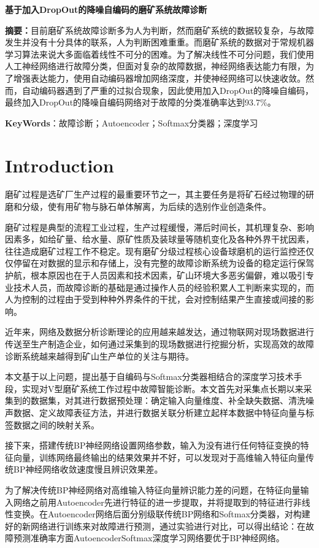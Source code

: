 
\textbf{基于加入DropOut的降噪自编码的磨矿系统故障诊断}

\textbf{摘要：}目前磨矿系统故障诊断多为人为判断，然而磨矿系统的数据较复杂，与故障发生并没有十分具体的联系，人为判断困难重重。而磨矿系统的数据对于常规机器学习算法来说大多面临着线性不可分的困难。为了解决线性不可分问题，我们使用人工神经网络进行故障分类，但面对复杂的故障数据，神经网络表达能力有限，为了增强表达能力，使用自动编码器增加网络深度，并使神经网络可以快速收敛。然而，自动编码器遇到了严重的过拟合现象，因此使用加入DropOut的降噪自编码，最终加入DropOut的降噪自编码网络对于故障的分类准确率达到93.7\%。

\textbf{KeyWords}：故障诊断；Autoencoder；Softmax分类器；深度学习

\section{Introduction}\label{introduction}

磨矿过程是选矿厂生产过程的最重要环节之一，其主要任务是将矿石经过物理的研磨和分级，使有用矿物与脉石单体解离，为后续的选别作业创造条件。

磨矿过程是典型的流程工业过程，生产过程缓慢，滞后时间长，其机理复杂、影响因素多，如给矿量、给水量、原矿性质及装球量等随机变化及各种外界干扰因素，往往造成磨矿过程工作不稳定。现有磨矿分级过程核心设备球磨机的运行监控还仅仅停留在对数据的显示和存储上，没有完整的故障诊断系统为设备的稳定运行保驾护航，根本原因也在于人员因素和技术因素，矿山环境大多恶劣偏僻，难以吸引专业技术人员，而故障诊断的基础是通过操作人员的经验积累人工判断来实现的，而人为控制的过程由于受到种种外界条件的干扰，会对控制结果产生直接或间接的影响。

近年来，网络及数据分析诊断理论的应用越来越发达，通过物联网对现场数据进行传送至生产制造企业，如何通过采集到的现场数据进行挖掘分析，实现高效的故障诊断系统越来越得到矿山生产单位的关注与期待。

本文基于以上问题，提出基于自编码与Softmax分类器相结合的深度学习技术手段，实现对V型磨矿系统工作过程中故障智能诊断。本文首先对采集点长期以来采集到的数据集，对其进行数据预处理：确定输入向量维度、补全缺失数据、清洗噪声数据、定义故障表征方法，并进行数据关联分析建立起样本数据中特征向量与标签数据之间的映射关系。

接下来，搭建传统BP神经网络设置网络参数，输入为没有进行任何特征变换的特征向量，训练网络最终输出的结果效果并不好，可以发现对于高维输入特征向量传统BP神经网络收敛速度慢且辨识效果差。

为了解决传统BP神经网络对高维输入特征向量辨识能力差的问题，在特征向量输入网络之前用Autoencoder先进行特征的进一步提取，并将提取到的特征进行非线性变换。在Autoencoder网络后面分别级联传统BP网络和Softmax分类器，对构建好的新网络进行训练来对故障进行预测，通过实验进行对比，可以得出结论：在故障预测准确率方面AutoencoderSoftmax深度学习网络要优于BP神经网络。


